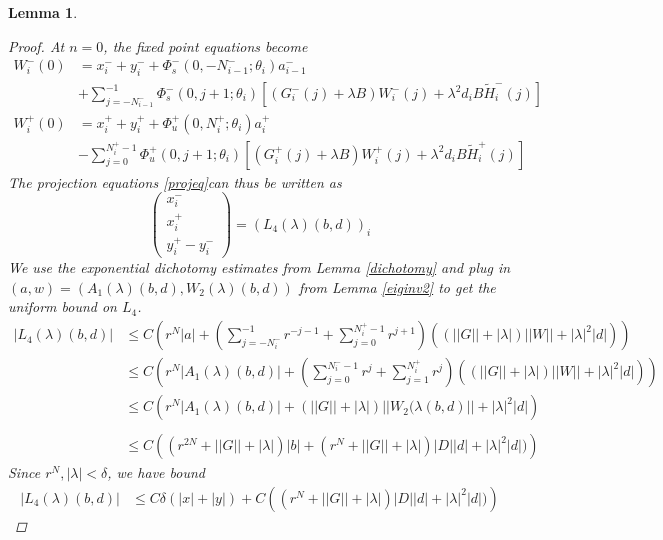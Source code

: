 \documentclass[12pt]{article}
\newtheorem{lemma}{Lemma}
\begin{document}
\begin{lemma}
\begin{proof}
At $n = 0$, the fixed point equations become 
\begin{align*}
W_i^-(0) &= x_i^- + y_i^- +
\Phi_s^-(0, -N_{i-1}^-; \theta_i) a_{i-1}^- \\
&+ \sum_{j = -N_{i-1}^-}^{-1} \Phi_s^-(0, j+1; \theta_i)
[(G_i^-(j) + \lambda B) W_i^-(j) + \lambda^2 d_i B \tilde{H}_i^-(j)] \\
W_i^+(0) &= x_i^+ + y_i^+ + \Phi_u^+(0, N_i^+; \theta_i) a_i^+ \\
&- \sum_{j = 0}^{N_i^+-1} \Phi_u^+(0, j+1; \theta_i) 
[(G_i^+(j) + \lambda B) W_i^+(j) + \lambda^2 d_i B \tilde{H}_i^+(j)]
\end{align*}
The projection equations \eqref{projeq}can thus be written as
\begin{equation}\label{projeq2}
\begin{pmatrix}
x_i^- \\ x_i^+ \\ y_i^+ - y_i^-
\end{pmatrix}
= (L_4(\lambda)(b,d))_i
\end{equation}
We use the exponential dichotomy estimates from Lemma \ref{dichotomy} and plug in $(a, w) = (A_1(\lambda)(b,d), W_2(\lambda)(b,d))$ from Lemma \ref{eiginv2} to get the uniform bound on $L_4$.
\begin{align*}
|L_4(\lambda)(b,d)| 
&\leq C \left( r^N |a| + \left(\sum_{j = -N_i^-}^{-1} r^{-j-1} + \sum_{j = 0}^{N_i^+ - 1} r^{j+1} \right)((||G|| + |\lambda|)||W|| + |\lambda|^2 |d|) \right) \\
&\leq C \left( r^N |A_1(\lambda)(b,d)| + \left(\sum_{j = 0}^{N_i^- -1} r^j + \sum_{j = 1}^{N_i^+} r^j \right)((||G|| + |\lambda|)||W|| + |\lambda|^2 |d|) \right) \\
&\leq C \left( r^N |A_1(\lambda)(b,d)| + (||G|| + |\lambda|)||W_2(\lambda(b,d)|| + |\lambda|^2 |d| \right) \\ \\
&\leq C \left( (r^{2N} + ||G|| + |\lambda|)|b| + 
(r^{N} + ||G|| + |\lambda|)|D| |d| + |\lambda|^2 |d| )
\right)
\end{align*}
Since $r^N, |\lambda| < \delta$, we have bound
\begin{align*}
|L_4(\lambda)(b,d)| &\leq C \delta(|x| + |y|) + C \left( (r^{N} + ||G|| + |\lambda|)|D| |d| + |\lambda|^2 |d| )
\right)
\end{align*}


\end{proof}
\end{lemma}
\end{document}
